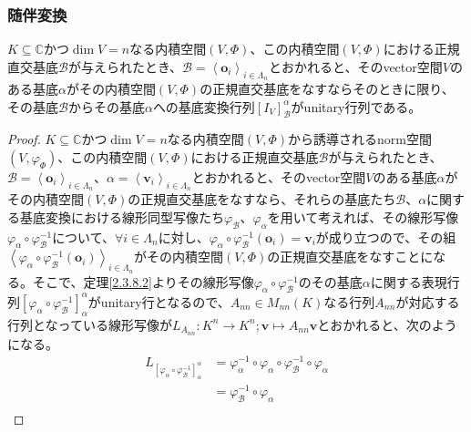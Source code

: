 \documentclass[dvipdfmx]{jsarticle}
\begin{document}
\subsubsection{随伴変換}%
\begin{thm}\label{2.3.8.4}
$K \subseteq \mathbb{C}$かつ$\dim V = n$なる内積空間$(V,\varPhi)$、この内積空間$(V,\varPhi)$における正規直交基底$\mathcal{B}$が与えられたとき、$\mathcal{B}=\left\langle \mathbf{o}_{i} \right\rangle_{i \in \varLambda_{n}}$とおかれると、そのvector空間$V$のある基底$\alpha$がその内積空間$(V,\varPhi)$の正規直交基底をなすならそのときに限り、その基底$\mathcal{B}$からその基底$\alpha$への基底変換行列$\left[ I_{V} \right]^{\alpha}_{\mathcal{B}}$がunitary行列である。
\end{thm}
\begin{proof}
$K \subseteq \mathbb{C}$かつ$\dim V = n$なる内積空間$(V,\varPhi)$から誘導されるnorm空間$\left( V,\varphi_{\varPhi} \right)$、この内積空間$(V,\varPhi)$における正規直交基底$\mathcal{B}$が与えられたとき、$\mathcal{B}=\left\langle \mathbf{o}_{i} \right\rangle_{i \in \varLambda_{n}}$、$\alpha = \left\langle \mathbf{v}_{i} \right\rangle_{i \in \varLambda_{n}}$とおかれると、そのvector空間$V$のある基底$\alpha$がその内積空間$(V,\varPhi)$の正規直交基底をなすなら、それらの基底たち$\mathcal{B}$、$\alpha$に関する基底変換における線形同型写像たち$\varphi_{\mathcal{B}}$、$\varphi_{\alpha}$を用いて考えれば、その線形写像$\varphi_{\alpha} \circ \varphi_{\mathcal{B}}^{- 1}$について、$\forall i \in \varLambda_{n}$に対し、$\varphi_{\alpha} \circ \varphi_{\mathcal{B}}^{- 1}\left( \mathbf{o}_{i} \right) = \mathbf{v}_{i}$が成り立つので、その組$\left\langle \varphi_{\alpha} \circ \varphi_{\mathcal{B}}^{- 1}\left( \mathbf{o}_{i} \right) \right\rangle_{i \in \varLambda_{n}}$がその内積空間$(V,\varPhi)$の正規直交基底をなすことになる。そこで、定理\ref{2.3.8.2}よりその線形写像$\varphi_{\alpha} \circ \varphi_{\mathcal{B}}^{- 1}$のその基底$\alpha$に関する表現行列$\left[ \varphi_{\alpha} \circ \varphi_{\mathcal{B}}^{- 1} \right]_{\alpha}^{\alpha}$がunitary行となるので、$A_{nn} \in M_{nn}(K)$なる行列$A_{nn}$が対応する行列となっている線形写像が$L_{A_{nn}}:K^{n} \rightarrow K^{n};\mathbf{v} \mapsto A_{nn}\mathbf{v}$とおかれると、次のようになる。
\begin{align*}
L_{\left[ \varphi_{\alpha} \circ \varphi_{\mathcal{B}}^{- 1} \right]_{\alpha}^{\alpha}} &= \varphi_{\alpha}^{- 1} \circ \varphi_{\alpha} \circ \varphi_{\mathcal{B}}^{- 1} \circ \varphi_{\alpha}\\
&= \varphi_{\mathcal{B}}^{- 1} \circ \varphi_{\alpha}\\

\end{align*}
\end{proof}
\end{document}
